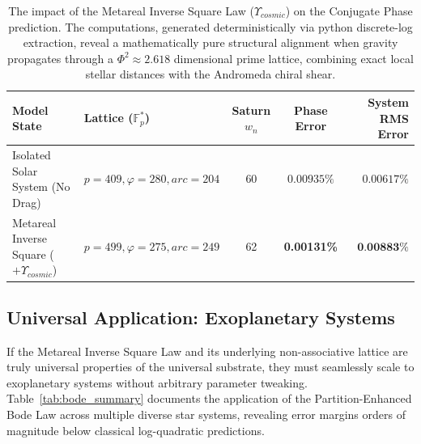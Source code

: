 \begin{table}[ht]
\centering
\renewcommand{\arraystretch}{1.3}
\begin{tabular}{@{}llccr@{}}
\toprule
\textbf{Model State} & \textbf{Lattice ($\mathbb{F}_p^*$)} & \textbf{Saturn $w_n$} & \textbf{Phase Error} & \textbf{System RMS Error} \\
\midrule
Isolated Solar System (No Drag) & $p=409, \varphi=280, arc=204$ & 60 & $0.00935\%$ & $0.00617\%$ \\
Metareal Inverse Square ($+ Υ_{cosmic}$) & $p=499, \varphi=275, arc=249$ & 62 & \textbf{0.00131\%} & $\textbf{0.00883\%}$ \\
\bottomrule
\end{tabular}
\caption{The impact of the Metareal Inverse Square Law ($Υ_{cosmic}$) on the Conjugate Phase prediction. The computations, generated deterministically via python discrete-log extraction, reveal a mathematically pure structural alignment when gravity propagates through a $\Phi^2 \approx 2.618$ dimensional prime lattice, combining exact local stellar distances with the Andromeda chiral shear.}
\label{tab:saturn_drag}
\end{table}

\subsection{Universal Application: Exoplanetary Systems}
If the Metareal Inverse Square Law and its underlying non-associative lattice are truly universal properties of the universal substrate, they must seamlessly scale to exoplanetary systems without arbitrary parameter tweaking. Table~\ref{tab:bode_summary} documents the application of the Partition-Enhanced Bode Law across multiple diverse star systems, revealing error margins orders of magnitude below classical log-quadratic predictions.

